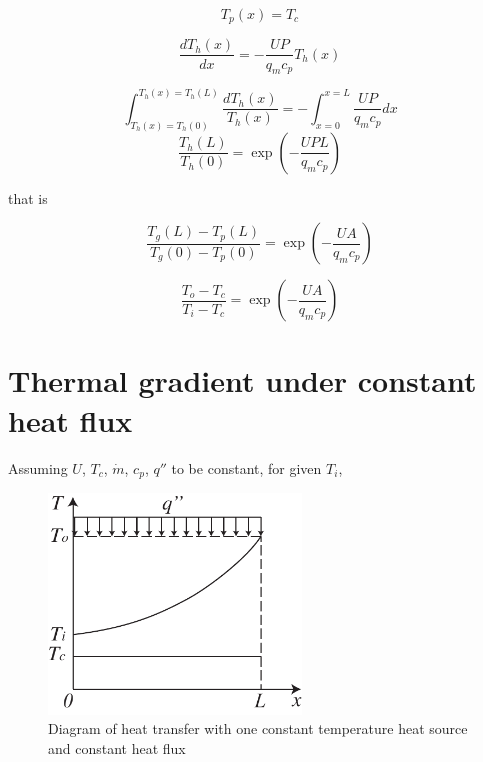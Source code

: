 \begin{equation}
T_{p}(x)=T_{c}
\end{equation}

\begin{equation}
\frac{dT_{h}(x)}{dx}=-\frac{UP}{q_{m}c_{p}}T_{h}(x)\label{eq:T_h(x)}
\end{equation}

\begin{equation}
\int_{T_{h}(x)=T_{h}(0)}^{T_{h}(x)=T_{h}(L)}\frac{dT_{h}(x)}{T_{h}(x)}=-\int_{x=0}^{x=L}\frac{UP}{q_{m}c_{p}}dx
\end{equation}
\begin{equation}
\frac{T_{h}(L)}{T_{h}(0)}=\exp(-\frac{UPL}{q_{m}c_{p}})
\end{equation}

that is

\begin{equation}
\frac{T_{g}(L)-T_{p}(L)}{T_{g}(0)-T_{p}(0)}=\exp(-\frac{UA}{q_{m}c_{p}})
\end{equation}

\begin{equation}
\frac{T_{o}-T_{c}}{T_{i}-T_{c}}=\exp(-\frac{UA}{q_{m}c_{p}})
\end{equation}

\chapter{Thermal gradient under constant heat flux}\label{cha:CTCHFHX}

Assuming $U$, $T_{c}$, $\dot{m}$, $c_p$, $q''$ to be constant, for
given $T_{i}$,

\noindent \begin{center}
\begin{figure}[h]
\noindent \begin{centering}
\includegraphics[width=0.6\textwidth]{fig/CTCHFHX.pdf}\caption{\label{fig:CTCHFHX}Diagram of heat transfer with one constant temperature
heat source and constant heat flux}
\par\end{centering}
\end{figure}
\par\end{center}


